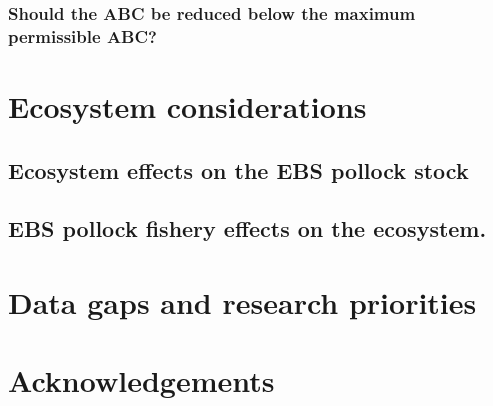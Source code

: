 \documentclass[11pt,]{article}
\begin{document}
\hypertarget{should-the-abc-be-reduced-below-the-maximum-permissible-abc}{%
\subsubsection{Should the ABC be reduced below the maximum permissible
ABC?}\label{should-the-abc-be-reduced-below-the-maximum-permissible-abc}}

\hypertarget{ecosystem-considerations}{%
\section{Ecosystem considerations}\label{ecosystem-considerations}}

\hypertarget{ecosystem-effects-on-the-ebs-pollock-stock}{%
\subsection{Ecosystem effects on the EBS pollock
stock}\label{ecosystem-effects-on-the-ebs-pollock-stock}}

\hypertarget{ebs-pollock-fishery-effects-on-the-ecosystem.}{%
\subsection{EBS pollock fishery effects on the
ecosystem.}\label{ebs-pollock-fishery-effects-on-the-ecosystem.}}

\hypertarget{data-gaps-and-research-priorities}{%
\section{Data gaps and research
priorities}\label{data-gaps-and-research-priorities}}

\hypertarget{acknowledgements}{%
\section{Acknowledgements}\label{acknowledgements}}
\end{document}
